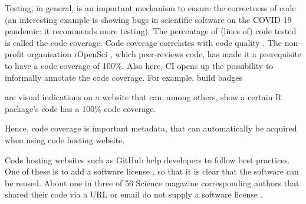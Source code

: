 Testing, in general, is an important mechanism to ensure
the correctness of code (an interesting example is \cite{rahman2020exploratory}
showing bugs in scientific software on the COVID-19 pandemic:
it recommends more testing).
The percentage of (lines of) code tested is called the code coverage.
Code coverage correlates with code quality \cite{horgan1994,del1995correlation}. 
The non-profit organisation rOpenSci \cite{ram2018community},
which peer-reviews code,
has made it a prerequisite to have a code coverage of 100\%.
Also here, CI opens up the possibility to informally annotate the
code coverage. 
For example, build badges

are visual indications on a website that can, among others,
show a certain R package's code has a 100\% code coverage.

Hence, code coverage is important metadata, that can automatically
be acquired when using code hosting website.

Code hosting websites such as GitHub help developers to follow
best practices. One of these is to add a software license \cite{jimenez2017four},
so that it is clear that the software can be reused.
About one in three of 56 Science magazine corresponding authors 
that shared their code via a URL or email
do not supply a software license \cite{stodden2018empirical}.

